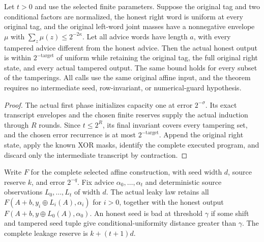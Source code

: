 \begin{theorem}
  \label{thm:lowerbounds-algebraic-affine-construction-extraction}
  \leanok
  Let $t>0$ and use the selected finite parameters. Suppose the original
  tag and two conditional factors are normalized, the honest right word
  is uniform at every original tag, and the original left-word joint
  masses have a nonnegative envelope $\mu$ with
  $\sum_z\mu(z)\le2^{-2\kappa}$. Let all advice words have length $a$,
  with every tampered advice different from the honest advice.
  Then the actual honest output is within $2^{-\mathrm{target}}$ of
  uniform while retaining the original tag, the full original right
  state, and every actual tampered output. The same bound holds for
  every subset of the tamperings. All calls use the same original affine
  input, and the theorem requires no intermediate seed, row-invariant,
  or numerical-guard hypothesis.
\end{theorem}
\begin{proof}
  \leanok
  The actual first phase initializes capacity one at error $2^{-\sigma}$.
  Its exact transcript envelopes and the chosen finite reserves supply
  the actual induction through $R$ rounds. Since $t\le2^R$, its final
  invariant covers every tampering set, and the chosen error recurrence
  is at most $2^{-\mathrm{target}}$. Append the original right state,
  apply the known XOR masks, identify the complete executed program,
  and discard only the intermediate transcript by contraction.
\end{proof}

\begin{definition}
  \label{def:lowerbounds-algebraic-affine-leakage}
  \leanok
  Write $F$ for the complete selected affine construction, with seed width
  $d$, source reserve $k$, and error $2^{-q}$. Fix advice
  $\alpha_0,\ldots,\alpha_t$ and deterministic source observations
  $L_0,\ldots,L_t$ of width $d$.
  The actual leaky law retains all
  $F(A+b,y_i\oplus L_i(A),\alpha_i)$ for $i>0$, together with the honest
  output $F(A+b,y\oplus L_0(A),\alpha_0)$.
  An honest seed is bad at threshold $\gamma$ if some shift and tampered
  seed tuple give conditional-uniformity distance greater than $\gamma$.
  The complete leakage reserve is $k+(t+1)d$.
\end{definition}

